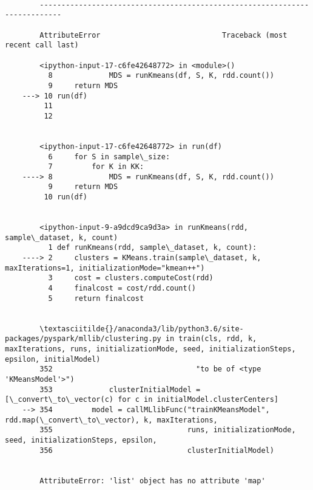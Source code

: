 \documentclass[11pt]{article}
\begin{document}
    \begin{Verbatim}[commandchars=\\\{\}]

        ---------------------------------------------------------------------------

        AttributeError                            Traceback (most recent call last)

        <ipython-input-17-c6fe42648772> in <module>()
          8             MDS = runKmeans(df, S, K, rdd.count())
          9     return MDS
    ---> 10 run(df)
         11 
         12 


        <ipython-input-17-c6fe42648772> in run(df)
          6     for S in sample\_size:
          7         for K in KK:
    ----> 8             MDS = runKmeans(df, S, K, rdd.count())
          9     return MDS
         10 run(df)


        <ipython-input-9-a9dcd9ca9d3a> in runKmeans(rdd, sample\_dataset, k, count)
          1 def runKmeans(rdd, sample\_dataset, k, count):
    ----> 2     clusters = KMeans.train(sample\_dataset, k, maxIterations=1, initializationMode="kmean++")
          3     cost = clusters.computeCost(rdd)
          4     finalcost = cost/rdd.count()
          5     return finalcost


        \textasciitilde{}/anaconda3/lib/python3.6/site-packages/pyspark/mllib/clustering.py in train(cls, rdd, k, maxIterations, runs, initializationMode, seed, initializationSteps, epsilon, initialModel)
        352                                 "to be of <type 'KMeansModel'>")
        353             clusterInitialModel = [\_convert\_to\_vector(c) for c in initialModel.clusterCenters]
    --> 354         model = callMLlibFunc("trainKMeansModel", rdd.map(\_convert\_to\_vector), k, maxIterations,
        355                               runs, initializationMode, seed, initializationSteps, epsilon,
        356                               clusterInitialModel)


        AttributeError: 'list' object has no attribute 'map'

    \end{Verbatim}


    
    
    
    
\end{document}
